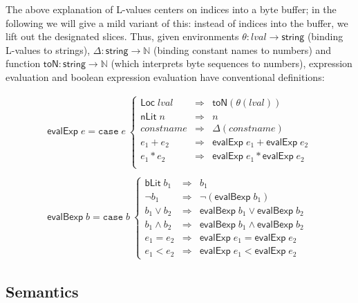 \documentclass[svgnames]{llncs}
\newcommand{\konst}[1]{\ensuremath{\mathsf{#1}}}
\newcommand{\lval}{\ensuremath{\mathit{lval}}}
\begin{document}
The above explanation of L-values centers on indices into a byte
buffer; in the following we will give a mild variant of this: instead
of indices into the buffer, we lift out the designated slices. Thus, given
environments $\theta: \mathit{lval} \to \konst{string}$ (binding
L-values to strings), $\Delta : \konst{string} \to \mathbb{N}$
(binding constant names to numbers) and function
$\konst{toN}:\konst{string}\to\mathbb{N}$ (which interprets byte
sequences to numbers), expression evaluation and boolean expression
evaluation have conventional definitions:

\[
\begin{array}{l}
\konst{evalExp} \; e =
\mathtt{case}\; e\
 \left\{
 \begin{array}{lcl}
    \konst{Loc}\; \lval & \Rightarrow & \konst{toN}(\theta(\lval)) \\
    \konst{nLit}\; n & \Rightarrow & n  \\
    \mathit{constname} & \Rightarrow & \Delta(\mathit{constname})  \\
    e_1 + e_2 & \Rightarrow & \konst{evalExp}\; e_1 + \konst{evalExp}\; e_2  \\
    e_1 * e_2 & \Rightarrow & \konst{evalExp}\; e_1 * \konst{evalExp}\; e_2  \\
  \end{array}
 \right.
 \\ \\
\konst{evalBexp} \; b =
\mathtt{case}\; b\
 \left\{
 \begin{array}{lcl}
    \konst{bLit}\; b_1 & \Rightarrow & b_1 \\
    \neg b_1 & \Rightarrow & \neg(\konst{evalBexp} \; b_1)  \\
    b_1 \lor b_2 & \Rightarrow & \konst{evalBexp} \;b_1 \lor \konst{evalBexp} \;b_2   \\
    b_1 \land b_2 & \Rightarrow & \konst{evalBexp} \;b_1 \land \konst{evalBexp} \;b_2   \\
    e_1 = e_2 & \Rightarrow & \konst{evalExp} \;e_1 = \konst{evalExp} \;e_2   \\
    e_1 < e_2 & \Rightarrow & \konst{evalExp} \;e_1 < \konst{evalExp} \;e_2
  \end{array}
 \right.

\end{array}
\]


\subsection{Semantics}
\end{document}

